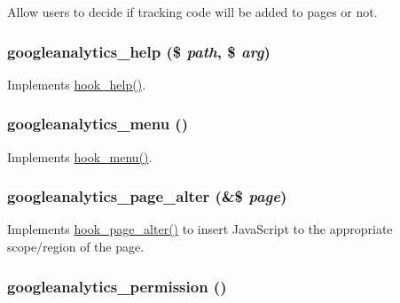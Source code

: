 Allow users to decide if tracking code will be added to pages or not. \hypertarget{googleanalytics_8module_a10055ad1b7bc9042ac16b1b7dace57de}{
\subsubsection[{googleanalytics\_\-help}]{\setlength{\rightskip}{0pt plus 5cm}googleanalytics\_\-help (\$ {\em path}, \/  \$ {\em arg})}}
\label{googleanalytics_8module_a10055ad1b7bc9042ac16b1b7dace57de}
Implements \hyperlink{group__hooks_ga5589c2714a782738e8851c4c90231f0e}{hook\_\-help()}. \hypertarget{googleanalytics_8module_a6fa96d968af1105942266ae3e32858be}{
\subsubsection[{googleanalytics\_\-menu}]{\setlength{\rightskip}{0pt plus 5cm}googleanalytics\_\-menu ()}}
\label{googleanalytics_8module_a6fa96d968af1105942266ae3e32858be}
Implements \hyperlink{group__hooks_ga5c95244fea59b25666e409759e133ded}{hook\_\-menu()}. \hypertarget{googleanalytics_8module_a08280011b658d2c0c1302eab3951f240}{
\subsubsection[{googleanalytics\_\-page\_\-alter}]{\setlength{\rightskip}{0pt plus 5cm}googleanalytics\_\-page\_\-alter (\&\$ {\em page})}}
\label{googleanalytics_8module_a08280011b658d2c0c1302eab3951f240}
Implements \hyperlink{group__hooks_gaa965aa8f38b48aed1a19c556c199145f}{hook\_\-page\_\-alter()} to insert JavaScript to the appropriate scope/region of the page. \hypertarget{googleanalytics_8module_ae66161f9d90584b809a6a68445ba4da7}{
\subsubsection[{googleanalytics\_\-permission}]{\setlength{\rightskip}{0pt plus 5cm}googleanalytics\_\-permission ()}}
